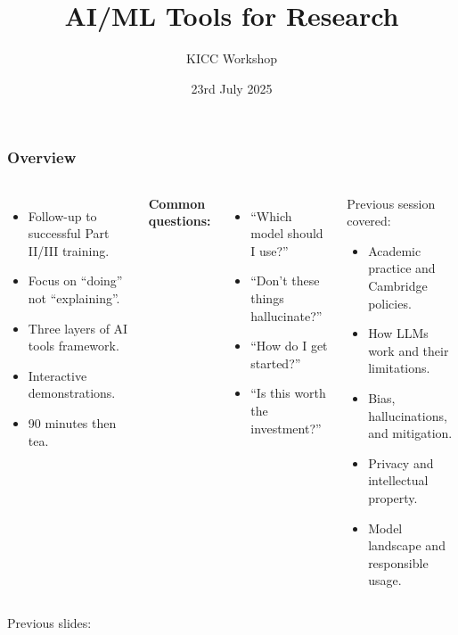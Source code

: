 \documentclass[aspectratio=169]{beamer}
\title{AI/ML Tools for Research}
\subtitle{KICC Workshop}
\date{23rd July 2025}
\begin{document}
\begin{frame}
    \titlepage
\end{frame}

\begin{frame}
    \frametitle{Overview}
    
    \begin{columns}
        \begin{itemize}
            \item Follow-up to successful Part II/III training.
            \item Focus on ``doing'' not ``explaining''.
            \item Three layers of AI tools framework.
            \item Interactive demonstrations.
            \item 90 minutes then tea.
        \end{itemize}
        
        \vspace{0.3cm}
        
        \textbf{Common questions:}
        \begin{itemize}
            \item ``Which model should I use?''
            \item ``Don't these things hallucinate?''
            \item ``How do I get started?''
            \item ``Is this worth the investment?''
        \end{itemize}
        
        \begin{block}{Previous session covered:}
            \begin{itemize}
                \item Academic practice and Cambridge policies.
                \item How LLMs work and their limitations.
                \item Bias, hallucinations, and mitigation.
                \item Privacy and intellectual property.
                \item Model landscape and responsible usage.
            \end{itemize}
        \end{block}
    \end{columns}
    
    \vfill
    \centering
    \footnotesize{Previous slides: }
\end{frame}
\end{document}
